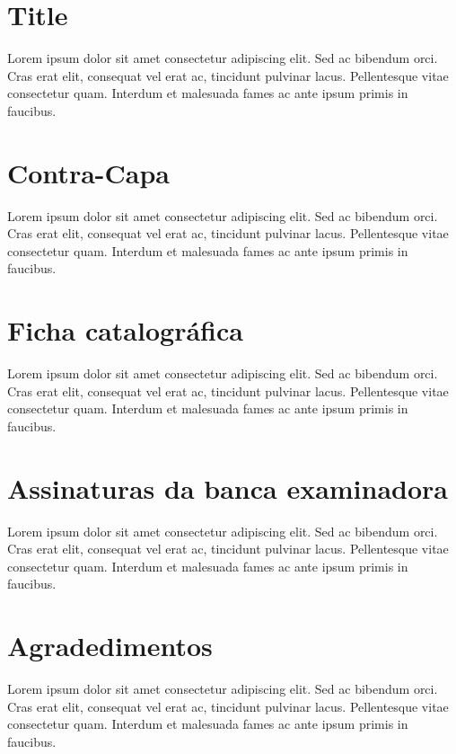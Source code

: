 \documentclass[11pt, a4paper]{report}
\begin{document}
\singlespacing

\section*{Title}
\par Lorem ipsum dolor sit amet consectetur adipiscing elit. Sed ac bibendum orci. Cras erat elit, consequat vel erat ac, tincidunt pulvinar lacus. Pellentesque vitae consectetur quam. Interdum et malesuada fames ac ante ipsum primis in faucibus.
\clearpage	

\section*{Contra-Capa}
\par Lorem ipsum dolor sit amet consectetur adipiscing elit. Sed ac bibendum orci. Cras erat elit, consequat vel erat ac, tincidunt pulvinar lacus. Pellentesque vitae consectetur quam. Interdum et malesuada fames ac ante ipsum primis in faucibus.
\clearpage

\section*{Ficha catalográfica}
\par Lorem ipsum dolor sit amet consectetur adipiscing elit. Sed ac bibendum orci. Cras erat elit, consequat vel erat ac, tincidunt pulvinar lacus. Pellentesque vitae consectetur quam. Interdum et malesuada fames ac ante ipsum primis in faucibus.
\clearpage

\section*{Assinaturas da banca examinadora}
\par Lorem ipsum dolor sit amet consectetur adipiscing elit. Sed ac bibendum orci. Cras erat elit, consequat vel erat ac, tincidunt pulvinar lacus. Pellentesque vitae consectetur quam. Interdum et malesuada fames ac ante ipsum primis in faucibus.
\clearpage

\section*{Agradedimentos}
\par Lorem ipsum dolor sit amet consectetur adipiscing elit. Sed ac bibendum orci. Cras erat elit, consequat vel erat ac, tincidunt pulvinar lacus. Pellentesque vitae consectetur quam. Interdum et malesuada fames ac ante ipsum primis in faucibus.
\clearpage
\end{document}
